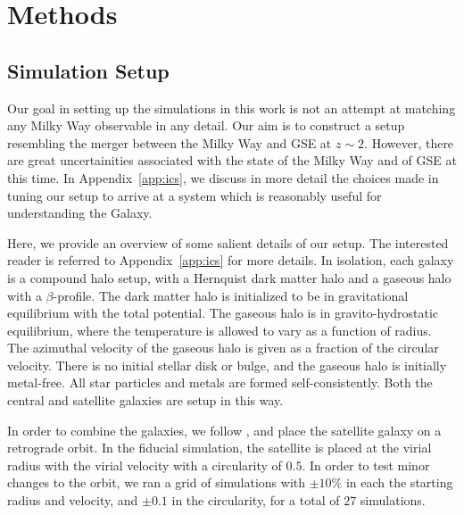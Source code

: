 \section{Methods}\label{sec:methods}
\subsection{Simulation Setup}\label{ssec:setup}
Our goal in setting up the simulations in this work is not an attempt at matching any Milky Way observable in any detail. Our aim is to construct a setup resembling the merger between the Milky Way and GSE at $z\sim2$. However, there are great uncertainities associated with the state of the Milky Way and of GSE at this time. In Appendix~\ref{app:ics}, we discuss in more detail the choices made in tuning our setup to arrive at a system which is reasonably useful for understanding the Galaxy.

Here, we provide an overview of some salient details of our setup. The interested reader is referred to Appendix~\ref{app:ics} for more details. In isolation, each galaxy is a compound halo setup, with a Hernquist dark matter halo and a gaseous halo with a $\beta$-profile. The dark matter halo is initialized to be in gravitational equilibrium with the total potential. The gaseous halo is in gravito-hydrostatic equilibrium, where the temperature is allowed to vary as a function of radius. The azimuthal velocity of the gaseous halo is given as a fraction of the circular velocity. There is no initial stellar disk or bulge, and the gaseous halo is initially metal-free. All star particles and metals are formed self-consistently. Both the central and satellite galaxies are setup in this way.

In order to combine the galaxies, we follow \citet{2021ApJ...923...92N}, and place the satellite galaxy on a retrograde orbit. In the fiducial simulation, the satellite is placed at the virial radius with the virial velocity with a circularity of $0.5$. In order to test minor changes to the orbit, we ran a grid of simulations with $\pm10\%$ in each the starting radius and velocity, and $\pm0.1$ in the circularity, for a total of $27$ simulations.